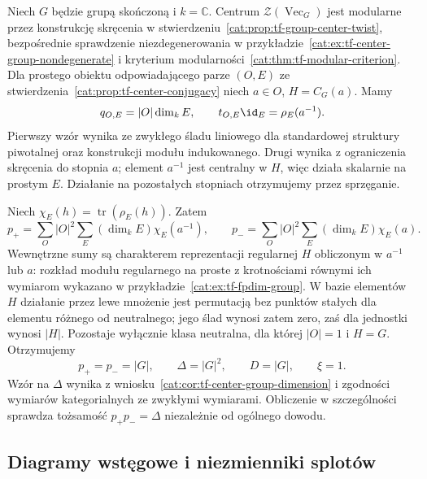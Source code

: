 \begin{przyklad}\label{cat:ex:tf-group-center-gauss}
Niech $G$ będzie grupą skończoną i $k=\mathbb C$. Centrum $\mathcal Z(\operatorname{Vec}_G)$ jest modularne przez konstrukcję skręcenia w stwierdzeniu~\ref{cat:prop:tf-group-center-twist}, bezpośrednie sprawdzenie niezdegenerowania w przykładzie~\ref{cat:ex:tf-center-group-nondegenerate} i kryterium modularności~\ref{cat:thm:tf-modular-criterion}. Dla prostego obiektu odpowiadającego parze $(O,E)$ ze stwierdzenia~\ref{cat:prop:tf-center-conjugacy} niech $a\in O$, $H=C_G(a)$. Mamy
\[
 q_{O,E}=|O|\dim_k E,\qquad
 t_{O,E}\id_E=\rho_E(a^{-1}).
\]
Pierwszy wzór wynika ze zwykłego śladu liniowego dla standardowej struktury piwotalnej oraz konstrukcji modułu indukowanego. Drugi wynika z ograniczenia skręcenia do stopnia $a$; element $a^{-1}$ jest centralny w $H$, więc działa skalarnie na prostym $E$. Działanie na pozostałych stopniach otrzymujemy przez sprzęganie.

Niech $\chi_E(h)=\operatorname{tr}(\rho_E(h))$. Zatem
\[
 p_+=\sum_O |O|^2\sum_E(\dim_k E)\chi_E(a^{-1}),
 \qquad
 p_-=\sum_O |O|^2\sum_E(\dim_k E)\chi_E(a).
\]
Wewnętrzne sumy są charakterem reprezentacji regularnej $H$ obliczonym w $a^{-1}$ lub $a$: rozkład modułu regularnego na proste z krotnościami równymi ich wymiarom wykazano w przykładzie~\ref{cat:ex:tf-fpdim-group}. W bazie elementów $H$ działanie przez lewe mnożenie jest permutacją bez punktów stałych dla elementu różnego od neutralnego; jego ślad wynosi zatem zero, zaś dla jednostki wynosi $|H|$. Pozostaje wyłącznie klasa neutralna, dla której $|O|=1$ i $H=G$. Otrzymujemy
\[
 p_+=p_-=|G|,\qquad \Delta=|G|^2,\qquad
 D=|G|,\qquad \xi=1.
\]
Wzór na $\Delta$ wynika z wniosku~\ref{cat:cor:tf-center-group-dimension} i zgodności wymiarów kategorialnych ze zwykłymi wymiarami. Obliczenie w szczególności sprawdza tożsamość $p_+p_-=\Delta$ niezależnie od ogólnego dowodu.
\end{przyklad}

\subsection{Diagramy wstęgowe i niezmienniki splotów}

